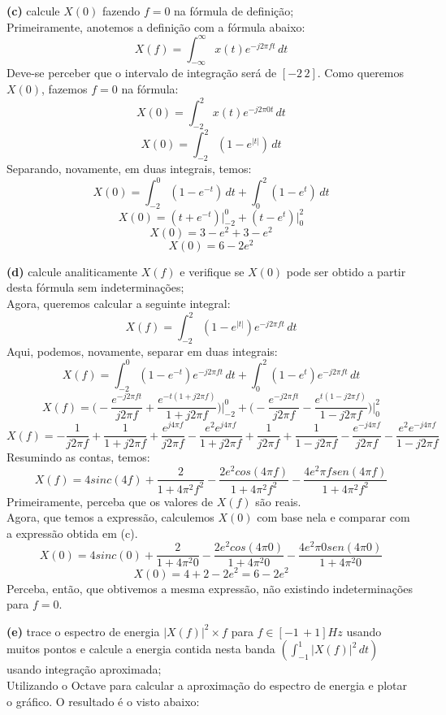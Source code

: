 \documentclass[10pt, a4paper]{article}
\begin{document}
{\textbf{(c)}} calcule $X(0)$ fazendo $f = 0$ na fórmula de definição;\\
Primeiramente, anotemos a definição com a fórmula abaixo:
\[X(f) = \int_{-\infty}^{\infty} x(t) e^{-j2\pi ft}\,dt\]
Deve-se perceber que o intervalo de integração será de $[-2\,2]$.
Como queremos $X(0)$, fazemos $f = 0$ na fórmula:
\[X(0) = \int_{-2}^{2} x(t) e^{-j2\pi 0t}\,dt\]
\[X(0) = \int_{-2}^{2} (1 - e^{|t|})\,dt\]
Separando, novamente, em duas integrais, temos:
\[X(0) = \int_{-2}^{0} (1 - e^{-t})\,dt + \int_{0}^{2} (1 - e^{t})\,dt\]
\[X(0) = (t + e^{-t})\bigg|_{-2}^{0} + (t - e^{t})\bigg|_{0}^{2}\]
\[X(0) = 3 - e^2 + 3 - e^2\]
\[X(0) = 6 - 2e^2\]

\vspace{\baselineskip}

{\textbf{(d)}} calcule analiticamente $X(f)$ e verifique se $X(0)$ pode ser obtido a partir desta fórmula sem indeterminações;\\
Agora, queremos calcular a seguinte integral:
\[X(f) = \int_{-2}^{2} (1 - e^{|t|})e^{-j2\pi ft}\,dt\]
Aqui, podemos, novamente, separar em duas integrais:
\[X(f) = \int_{-2}^{0} (1 - e^{-t})e^{-j2\pi ft}\,dt + \int_{0}^{2} (1 - e^{t})e^{-j2\pi ft}\,dt\]
\[X(f) = \biggl(-\frac{e^{-j2\pi ft}}{j2\pi f} + \frac{e^{-t(1 + j2\pi f)}}{1 + j2\pi f}\biggr)\bigg|_{-2}^{0} + 
\biggl(-\frac{e^{-j2\pi ft}}{j2\pi f} - \frac{e^{t(1 - j2\pi f)}}{1 - j2\pi f}\biggr)\bigg|_{0}^{2}\]
\[X(f) = -\frac{1}{j2\pi f} + \frac{1}{1 + j2\pi f} + \frac{e^{j4\pi f}}{j2\pi f} - \frac{e^2e^{j4\pi f}}{1 + j2\pi f} +
\frac{1}{j2\pi f} + \frac{1}{1 - j2\pi f} - \frac{e^{-j4\pi f}}{j2\pi f} - \frac{e^2e^{-j4\pi f}}{1 - j2\pi f}\]
Resumindo as contas, temos:
\[X(f) = 4sinc(4f) + \frac{2}{1 + 4\pi^2f^2} - \frac{2e^2cos(4\pi f)}{1 + 4\pi^2 f^2} - \frac{4e^2\pi f sen(4\pi f)}{1 + 4\pi^2 f^2}\]
Primeiramente, perceba que os valores de $X(f)$ são reais.\\
Agora, que temos a expressão, calculemos $X(0)$ com base nela e comparar com a expressão obtida em (c).
\[X(0) = 4sinc(0) + \frac{2}{1 + 4\pi^2 0} - \frac{2e^2cos(4\pi 0)}{1 + 4\pi^2 0} - \frac{4e^2\pi 0 sen(4\pi 0)}{1 + 4\pi^2 0}\]
\[X(0) = 4 + 2 - 2e^2 = 6 - 2e^2\]
Perceba, então, que obtivemos a mesma expressão, não existindo indeterminações para $f = 0$.

\vspace{\baselineskip}

{\textbf{(e)}} trace o espectro de energia $|X(f)|^{2} \times f$ para $f \in [-1\,+ 1]Hz$ usando muitos pontos e calcule a energia contida nesta banda $(\int_{-1}^{1} |X(f)|^{2}\,dt)$ usando integração aproximada;\\
Utilizando o Octave para calcular a aproximação do espectro de energia e plotar o gráfico. O resultado é o visto abaixo:
\end{document}

